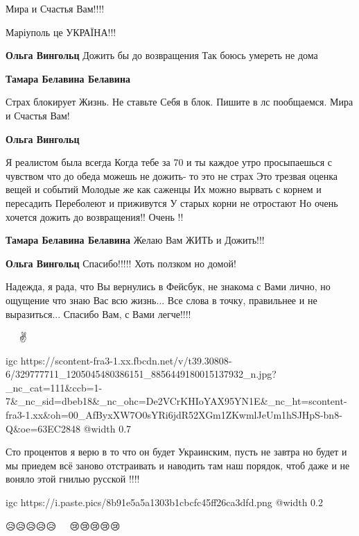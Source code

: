 Мира и Счастья Вам!!!!

Маріуполь це УКРАЇНА!!!

\begin{itemize} %
\textbf{Ольга Вингольц} Дожить бы до возвращения Так боюсь умереть не дома

\textbf{Тамара Белавина Белавина} 

Страх блокирует Жизнь. Не ставьте Себя в блок. Пишите в лс пообщаемся. Мира и
Счастья Вам!

\textbf{Ольга Вингольц} 

Я реалистом была всегда Когда тебе за 70 и ты каждое утро просыпаешься с
чувством что до обеда можешь не дожить- то это не страх Это трезвая оценка
вещей и событий Молодые же как саженцы Их можно вырвать с корнем и пересадить
Переболеют и приживутся У старых корни не отростают Но очень хочется дожить до
возвращения!! Очень !!

\textbf{Тамара Белавина Белавина} Желаю Вам ЖИТЬ и Дожить!!!

\textbf{Ольга Вингольц} Спасибо!!!!! Хоть ползком но домой!
\end{itemize} %


Надежда, я рада, что Вы вернулись в Фейсбук, не знакома с Вами лично, но
ощущение что знаю Вас всю жизнь... Все слова в точку, правильнее и не
выразиться... Спасибо Вам, с Вами легче!!!!

💖🙌🙏🙏🙏✌

\ifcmt
  igc https://scontent-fra3-1.xx.fbcdn.net/v/t39.30808-6/329777711_1205045480386151_8856449180015137932_n.jpg?_nc_cat=111&ccb=1-7&_nc_sid=dbeb18&_nc_ohc=De2VCrKHIoYAX95YN1E&_nc_ht=scontent-fra3-1.xx&oh=00_AfByxXW7O0sYRi6jdR52XGm1ZKwmlJeUm1hSJHpS-bn8-Q&oe=63EC2848
	@width 0.7
\fi


Сто процентов я верю в то что он будет Украинским, пусть не завтра но будет и
мы приедем всё заново отстраивать и наводить там наш порядок, чтоб даже и не
воняло этой гнилью русской !!!!


\ifcmt
  igc https://i.paste.pics/8b91e5a5a1303b1cbcfc45ff26ca3dfd.png
	@width 0.2
\fi


😥😥😥😥😥🥺🥺🥺🥺🥺😢😢😢😢😢💔💔💔💔💔💔💔💔

